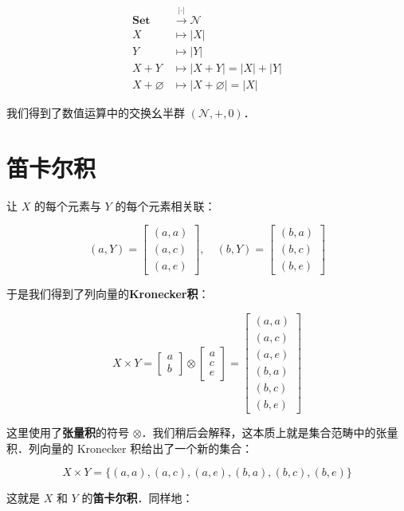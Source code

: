 \documentclass[10pt, openany]{book}
\begin{document}
\[
\begin{aligned}
\textbf{Set} &\stackrel{|\cdot|}{\longrightarrow} \mathcal N \\
X &\mapsto |X| \\
Y &\mapsto |Y| \\
X + Y &\mapsto |X + Y| = |X| + |Y| \\
X + \varnothing &\mapsto |X + \varnothing| = |X|
\end{aligned}
\]

我们得到了数值运算中的交换幺半群 $(\mathcal N,+,0)$．

\section{笛卡尔积}

让 $X$ 的每个元素与 $Y$ 的每个元素相关联：

\[
(a,Y) = \begin{bmatrix}(a,a)\\(a,c)\\(a,e)\end{bmatrix},\quad
(b,Y) = \begin{bmatrix}(b,a)\\(b,c)\\(b,e)\end{bmatrix}
\]

于是我们得到了列向量的\textbf{Kronecker积}：

\[
X \times Y = \begin{bmatrix}a\\b\end{bmatrix} \otimes \begin{bmatrix}a\\c\\e\end{bmatrix}
= \begin{bmatrix}(a,a)\\(a,c)\\(a,e)\\(b,a)\\(b,c)\\(b,e)\end{bmatrix}
\]

这里使用了\textbf{张量积}的符号 $\otimes$．我们稍后会解释，这本质上就是集合范畴中的张量积．列向量的 Kronecker 积给出了一个新的集合：

\[
X \times Y = \{ (a,a),(a,c),(a,e),(b,a),(b,c),(b,e) \}
\]

这就是 $X$ 和 $Y$ 的\textbf{笛卡尔积}．同样地：
\end{document}
